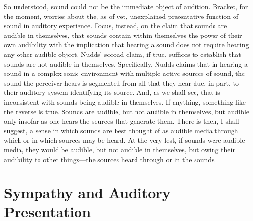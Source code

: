 So understood, sound could not be the immediate object of audition. Bracket, for the moment, worries about the, as of yet, unexplained presentative function of sound in auditory experience. Focus, instead, on the claim that sounds are audible in themselves, that sounds contain within themselves the power of their own audibility with the implication that hearing a sound does not require hearing any other audible object. Nudds' second claim, if true, suffices to establish that sounds are not audible in themselves. Specifically, Nudds claims that in hearing a sound in a complex sonic environment with multiple active sources of sound, the sound the perceiver hears is segmented from all that they hear due, in part, to their auditory system identifying its source. And, as we shall see, that is inconsistent with sounds being audible in themselves. If anything, something like the reverse is true. Sounds are audible, but not audible in themselves, but audible only insofar as one hears the sources that generate them. There is then, I shall suggest, a sense in which sounds are best thought of as audible media through which or in which sources may be heard. At the very lest, if sounds were audible media, they would be audible, but not audible in themselves, but owing their audibility to other things---the sources heard through or in the sounds.


\section{Sympathy and Auditory Presentation} %
\label{sec:sympathy_and_auditory_presentation}


